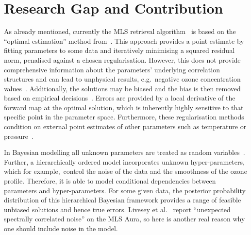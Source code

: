 \section{Research Gap and Contribution}

As already mentioned, currently the MLS retrieval algorithm~\cite{livesey2006retrieval} is based on the ``optimal estimation'' method from~\cite{rodgers1976retrieval}.
This approach provides a point estimate by fitting parameters to some data and iteratively minimising a squared residual norm, penalised against a chosen regularisation.
However, this does not provide comprehensive information about the parameters' underlying correlation structures and can lead to unphysical results, e.g.~negative ozone concentration values~\cite{MLSdata}.
Additionally, the solutions may be biased and the bias is then removed based on empirical decisions~\cite{livesey2008ozonecarbonmono, Froidevaux2008snrozone}.
Errors are provided by a local derivative of the forward map at the optimal solution, which is inherently highly sensitive to that specific point in the parameter space.
Furthermore, these regularisation methods condition on external point estimates of other parameters such as temperature or pressure~\cite{livesey2006retrieval}.

In Bayesian modelling all unknown parameters are treated as random variables~\cite{kaipio2005statinv}.
Further, a hierarchically ordered model incorporates unknown hyper-parameters, which for example,~control the noise of the data and the smoothness of the ozone profile.
Therefore, it is able to model conditional dependencies between parameters and hyper-parameters.
For some given data, the posterior probability distribution of this hierarchical Bayesian framework provides a range of feasible unbiased solutions and hence true errors.
Livesey et al.~\cite{livesey2006retrieval} report ``unexpected spectrally correlated noise'' on the MLS Aura, so here is another real reason why one should include noise in the model.


